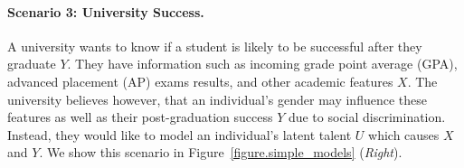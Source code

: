 
\paragraph{Scenario 3: University Success.}
A university wants to know if a student is likely to be successful after they graduate $Y$. They have information such as incoming grade point average (GPA), advanced placement (AP) exams results, and other academic features $X$. The university believes however, that an individual's gender may influence these features as well as their post-graduation success $Y$ due to social discrimination. Instead, they would like to model an individual's latent talent $U$ which causes $X$ and $Y$. We show this scenario in Figure~\ref{figure.simple_models} (\emph{Right}).






